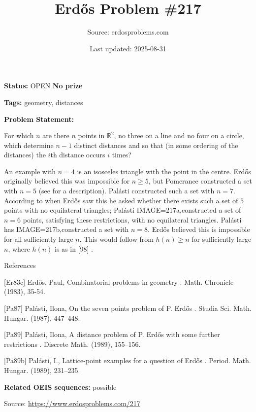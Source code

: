 \documentclass{article}
\title{Erd\H{o}s Problem \#217}
\date{Last updated: 2025-08-31}
\author{Source: erdosproblems.com}
\begin{document}
\maketitle

\noindent\textbf{Status:} OPEN \quad \textbf{No prize}

\noindent\textbf{Tags:} geometry, distances

\medskip

\noindent\textbf{Problem Statement:}

For which $n$ are there $n$ points in $\mathbb{R}^2$, no three on a line and no four on a circle, which determine $n-1$ distinct distances and so that (in some ordering of the distances) the $i$th distance occurs $i$ times?




An example with $n=4$ is an isosceles triangle with the point in the centre. Erd\H{o}s originally believed this was impossible for $n\geq 5$, but Pomerance constructed a set with $n=5$ (see \cite{Er83c} for a description). Pal\'{a}sti \cite{Pa87} constructed such a set with $n=7$. According to \cite{Pa89} when Erd\H{o}s saw this he asked whether there exists such a set of $5$ points with no equilateral triangles; Pal\'{a}sti \cite{Pa89} {IMAGE=217a,constructed a set} of $n=6$ points, satisfying these restrictions, with no equilateral triangles. Pal\'{a}sti \cite{Pa89b} has {IMAGE=217b,constructed a set} with $n=8$. Erd\H{o}s believed this is impossible for all sufficiently large $n$. This would follow from $h(n)\geq n$ for sufficiently large $n$, where $h(n)$ is as in [98] .




References

[Er83c] Erd\H{o}s, Paul, Combinatorial problems in geometry . Math. Chronicle (1983), 35-54.

[Pa87] Pal\'{a}sti, Ilona, On the seven points problem of {P}. {E}rd\H os . Studia Sci. Math. Hungar. (1987), 447--448.

[Pa89] Pal\'{a}sti, Ilona, A distance problem of {P}. {E}rd\H os with some further restrictions . Discrete Math. (1989), 155--156.

[Pa89b] Pal\'{a}sti, I., Lattice-point examples for a question of {E}rd\H os . Period. Math. Hungar. (1989), 231--235.

\noindent\textbf{Related OEIS sequences:} possible


\bigskip
\noindent\small{Source: \url{https://www.erdosproblems.com/217}}
\end{document}
